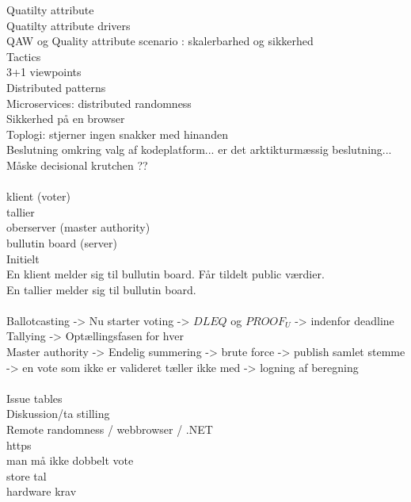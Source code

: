 \noindent
Quatilty attribute\\
Quatilty attribute drivers\\
QAW og Quality attribute scenario : skalerbarhed og sikkerhed\\
Tactics\\
3+1 viewpoints\\
Distributed patterns\\
Microservices: distributed randomness\\
Sikkerhed på en browser\\
Toplogi: stjerner ingen snakker med hinanden\\
Beslutning omkring valg af kodeplatform... er det arktikturmæssig beslutning... Måske decisional krutchen ??\\\\

\noindent
klient (voter)\\
tallier\\
oberserver (master authority)\\
bullutin board (server)\\
\noindent
Initielt\\
En klient melder sig til bullutin board. Får tildelt public værdier. \\
En tallier melder sig til bullutin board. \\\\
\noindent
Ballotcasting -> Nu starter voting ->  $DLEQ$ og $PROOF_U$ -> indenfor deadline\\
Tallying -> Optællingsfasen for hver \\
Master authority -> Endelig summering -> brute force -> publish samlet stemme -> en vote som ikke er valideret tæller ikke med -> logning af beregning \\\\

\noindent
Issue tables\\
Diskussion/ta stilling \\
Remote randomness / webbrowser / .NET\\
https\\
man må ikke dobbelt vote\\
store tal\\
hardware krav